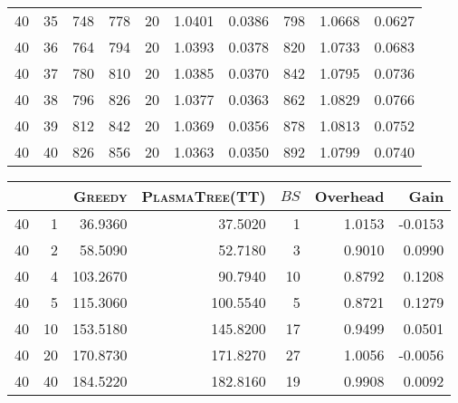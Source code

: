 \documentclass[a4paper,twopages]{article}
\newcommand{\BS}{\ensuremath{\mathit{BS}}\xspace}
\newcommand{\MC}{\textsc{Fibonacci}\xspace}
\newcommand{\Greedy}{\textsc{Greedy}\xspace}
\newcommand{\PT}{\textsc{PlasmaTree}\xspace}
\begin{document}
\begin{table*}
{\begin{tabular}{|r|r|r||r|r|r|r||r|r|r|}
       40 &35 &    748 &    778 &    20 &   1.0401 &  0.0386 &  798 &   1.0668 &  0.0627\\
       40 &36 &    764 &    794 &    20 &   1.0393 &  0.0378 &  820 &   1.0733 &  0.0683\\
       40 &37 &    780 &    810 &    20 &   1.0385 &  0.0370 &  842 &   1.0795 &  0.0736\\
       40 &38 &    796 &    826 &    20 &   1.0377 &  0.0363 &  862 &   1.0829 &  0.0766\\
       40 &39 &    812 &    842 &    20 &   1.0369 &  0.0356 &  878 &   1.0813 &  0.0752\\
       40 &40 &    826 &    856 &    20 &   1.0363 &  0.0350 &  892 &   1.0799 &  0.0740\\
       \hline
    \end{tabular}
    }
    \caption{\Greedy versus \PT (TT) and \MC (Theoretical)}
\end{table*}
\begin{table*}
    \centering
    \centering
    \begin{tabular}{|r|r|r||r|r|r|r|}
       \hline
          &   & \Greedy & \PT (TT) & \BS & Overhead &   Gain\\
         \hline
        40 &  1 &   36.9360 &   37.5020 &  1 &   1.0153 &-0.0153\\
        40 &  2 &   58.5090 &   52.7180 &  3 &   0.9010 & 0.0990\\
        40 &  4 &  103.2670 &   90.7940 & 10 &   0.8792 & 0.1208\\
        40 &  5 &  115.3060 &  100.5540 &  5 &   0.8721 & 0.1279\\
        40 & 10 &  153.5180 &  145.8200 & 17 &   0.9499 & 0.0501\\
        40 & 20 &  170.8730 &  171.8270 & 27 &   1.0056 &-0.0056\\
        40 & 40 &  184.5220 &  182.8160 & 19 &   0.9908 & 0.0092\\
       \hline
    \end{tabular}
    \caption{\Greedy versus \PT (TT) (Experimental Double)}
\end{table*}
\end{document}

